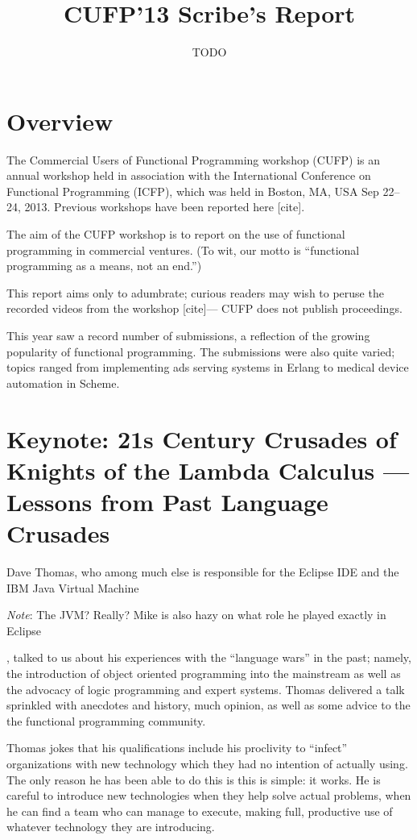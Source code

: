 \documentclass{jfp1}
\title{CUFP'13 Scribe's Report}
\author[Authors]
        {TODO}
\newenvironment{ipar}[0]%
 {\begin{list}{}%
 {\setlength{\leftmargin}{1cm}}%
\item[]%
 }
 {\end{list}}
\newcommand\needcite{{\color{red} [cite]}\xspace}
\newcommand{\note}[1]{ \begin{ipar}  {\color{Gray} \textit{Note}: #1} \end{ipar}}
\begin{document}
\maketitle

\tableofcontents

\section{Overview}

The Commercial Users of Functional Programming workshop (CUFP) is an
annual workshop held in association with the International Conference
on Functional Programming (ICFP), which was held in Boston, MA, USA
Sep 22--24, 2013. Previous workshops have been reported here
\needcite.

The aim of the CUFP workshop is to report on the use of functional
programming in commercial ventures. (To wit, our motto is ``functional
programming as a means, not an end.'')

This report aims only to adumbrate; curious readers may wish to peruse
the recorded videos from the workshop \needcite --- CUFP does not
publish proceedings.

This year saw a record number of submissions, a reflection of the
growing popularity of functional programming. The submissions were
also quite varied; topics ranged from implementing ads serving systems
in Erlang to medical device automation in Scheme.

\section{Keynote: 21s Century Crusades of Knights of the Lambda
Calculus — Lessons from Past Language Crusades}

Dave Thomas, who among much else is responsible for the Eclipse IDE
and the IBM Java Virtual Machine\note{The JVM? Really? Mike is also
  hazy on what role he played exactly in Eclipse}, talked to us about
  his experiences
with the ``language wars'' in the past; namely, the introduction of
object oriented programming into the mainstream as well as the
advocacy of logic programming and expert systems. Thomas delivered a
talk sprinkled with anecdotes and history, much opinion, as well as
some advice to the the functional programming community.


Thomas jokes that his qualifications include his proclivity to
``infect'' organizations with new technology which they had no
intention of actually using. The only reason he has been able to do
this is this is simple: it works. He is careful to introduce new
technologies when they help solve actual problems, when he can find a
team who can manage to execute, making full, productive use of
whatever technology they are introducing.
\end{document}
